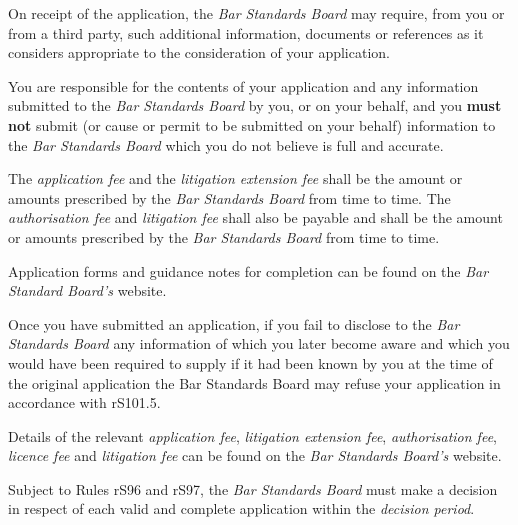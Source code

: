 
On receipt of the application, the \emph{Bar Standards Board} may
require, from you or from a third party, such additional information,
documents or references as it considers appropriate to the consideration
of your application.


You are responsible for the contents of your application and any
information submitted to the \emph{Bar Standards Board} by you, or on
your behalf, and you \textcolor{myred}{\textbf{must not }}submit (or cause or permit to be submitted
on your behalf) information to the \emph{Bar Standards Board} which you
do not believe is full and accurate.


The \emph{application fee} and the \emph{litigation extension fee} shall
be the amount or amounts prescribed by the \emph{Bar Standards Board}
from time to time. The \emph{authorisation fee} and \emph{litigation
fee} shall also be payable and shall be the amount or amounts prescribed
by the \emph{Bar Standards Board} from time to time.





Application forms and guidance notes for completion can be found on the
\emph{Bar Standard Board's} website.


Once you have submitted an application, if you fail to disclose to the
\emph{Bar Standards Board} any information of which you later become
aware and which you would have been required to supply if it had been
known by you at the time of the original application the Bar Standards
Board may refuse your application in accordance with rS101.5.


Details of the relevant \emph{application fee}, \emph{litigation
extension fee}, \emph{authorisation fee}, \emph{licence fee} and
\emph{litigation fee} can be found on the \emph{Bar Standards Board's}
website.




Subject to Rules rS96 and rS97, the \emph{Bar Standards Board} must make
a decision in respect of each valid and complete application within the
\emph{decision period}.

